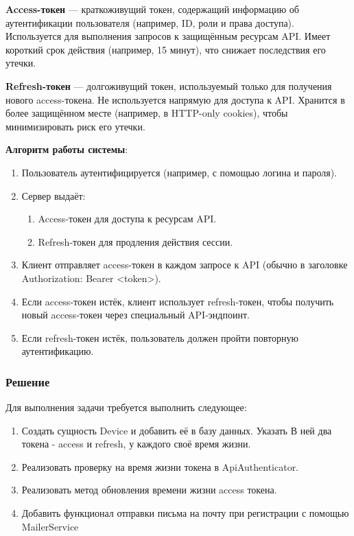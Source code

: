 \documentclass[pract]{SCWorks}
\begin{document}
\textbf{Access-токен} — краткоживущий токен, содержащий информацию об 
аутентификации пользователя (например, ID, роли и права доступа). Используется 
для выполнения запросов к защищённым ресурсам API. Имеет короткий срок действия
(например, 15 минут), что снижает последствия его утечки.

\textbf{Refresh-токен} — долгоживущий токен, используемый только для получения 
нового access-токена. Не используется напрямую для доступа к API. Хранится в 
более защищённом месте (например, в HTTP-only cookies), чтобы минимизировать 
риск его утечки.

\textbf{Алгоритм работы системы}:

\begin{enumerate}
    \item Пользователь аутентифицируется (например, с помощью логина и пароля).
    \item Сервер выдаёт:
    \begin{enumerate}
        \item Access-токен для доступа к ресурсам API.
        \item Refresh-токен для продления действия сессии.
    \end{enumerate}
    \item Клиент отправляет access-токен в каждом запросе к API 
    (обычно в заголовке Authorization: Bearer <token>).
    \item Если access-токен истёк, клиент использует refresh-токен, 
    чтобы получить новый access-токен через специальный API-эндпоинт.
    \item Если refresh-токен истёк, пользователь должен пройти повторную 
    аутентификацию.
\end{enumerate}

\subsubsection{Решение}

Для выполнения задачи требуется выполнить следующее:

\begin{enumerate}
    \item Создать сущность Device и добавить её в базу данных. Указать В
    ней два токена - access и refresh, у каждого своё время жизни.
    \item Реализовать проверку на время жизни токена в ApiAuthenticator.
    \item Реализовать метод обновления времени жизни access токена.
    \item Добавить функционал отправки письма на почту при регистрации
    с помощью MailerService
\end{enumerate}
\end{document}
